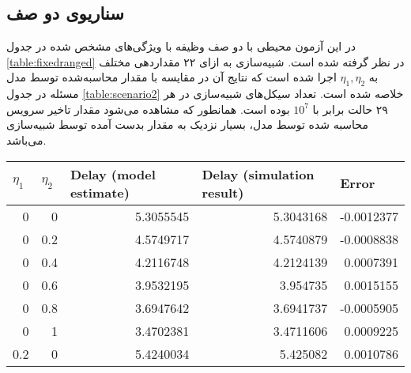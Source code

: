 \subsection{سناریوی دو صف}
در این آزمون محیطی با دو صف وظیفه با ویژگی‌های مشخص شده در جدول \ref{table:fixedranged} در نظر گرفته شده است. شبیه‌سازی به ازای ۲۲ مقداردهی مختلف به $\eta_1, \eta_2$ اجرا شده است که نتایج آن در مقایسه با مقدار محاسبه‌شده توسط مدل مسئله در جدول \ref{table:scenario2} خلاصه شده است. تعداد سیکل‌های شبیه‌سازی در هر ۲۹ حالت برابر با $10^7$ بوده است. همانطور که مشاهده می‌شود مقدار تاخیر سرویس محاسبه شده توسط مدل، بسیار نزدیک به مقدار بدست آمده توسط شبیه‌سازی می‌باشد.
\begin{table}[]
	\centering
	\begin{latin}
		\begin{tabular}{@{}rrrrr@{}}
			\toprule
			\multicolumn{1}{l}{$\eta_1$} & \multicolumn{1}{l}{$\eta_2$} & \multicolumn{1}{l}{Delay (model estimate)} & \multicolumn{1}{l}{Delay (simulation result)} & \multicolumn{1}{l}{Error} \\ \midrule
			0                        & 0                        & 5.3055545                                  & 5.3043168                                     & -0.0012377                \\
			0                        & 0.2                      & 4.5749717                                  & 4.5740879                                     & -0.0008838                \\
			0                        & 0.4                      & 4.2116748                                  & 4.2124139                                     & 0.0007391                 \\
			0                        & 0.6                      & 3.9532195                                  & 3.954735                                      & 0.0015155                 \\
			0                        & 0.8                      & 3.6947642                                  & 3.6941737                                     & -0.0005905                \\
			0                        & 1                        & 3.4702381                                  & 3.4711606                                     & 0.0009225                 \\
			0.2                      & 0                        & 5.4240034                                  & 5.425082                                      & 0.0010786                 \\

\end{tabular}
\end{latin}
\end{table}
